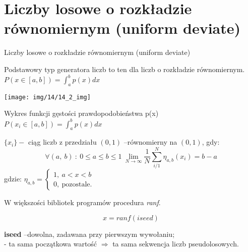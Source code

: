 \section{Liczby losowe o rozkładzie równomiernym (uniform deviate)}
\begin{frame}{Liczby losowe o rozkładzie równomiernym (uniform deviate)}


	Podstawowy typ generatora liczb to ten dla liczb o rozkładzie równomiernym.
	$P(x \in [a,b])=\int_{a}^{b} p(x)dx$
	\begin{center}
	\texttt{[image: img/14/14\_2\_img]}
	\end{center}
	Wykres funkcji gęstości prawdopodobieństwa p(x) 
		$P(x_i \in [a,b])=\int_{a}^{b} p(x)dx$
    \end{frame}

    \begin{frame}
    \begin{exampleblock}{}
	$\{x_{i}\}-$ ciąg liczb z przedziału $(0,1)$ --równomierny na $(0,1)$, gdy:
	$$
	\forall(a,\ b)\ :\ 0\leq a\leq b\leq 1\ \lim_{N\rightarrow\infty}\frac{1}{N}\sum_{i/1}^{N}\eta_{a,b}		(x_{i})=b-a
	$$
	gdzie: $\eta_{a,b}=\left\{\begin{array}{l}
	1,\ a<x<b\\
	0,\ \mathrm{p}\mathrm{o}\mathrm{z}\mathrm{o}\mathrm{s}\mathrm{t}\mathrm{a}\mathrm{l}\mathrm{e}.
	\end{array}\right.$
	\end{exampleblock}
	W większości bibliotek programów procedura \textit{ranf}.

            \[
            	x = ranf(iseed)
            \]


	\textbf{iseed} --dowolna, zadawana przy pierwszym wywołaniu; \\
	- ta sama początkowa wartość $\Rightarrow$ ta sama sekwencja liczb pseudolosowych.
	\end{frame}
